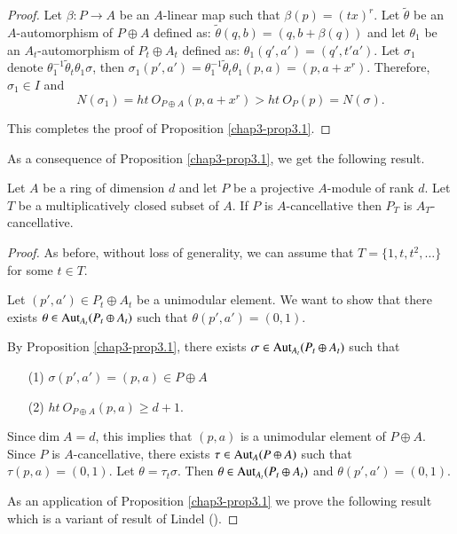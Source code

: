 \begin{proof}
Let $\beta:P\to A$ be an $A$-linear map such that
$\beta(p)=(tx)^{r}$. Let $\widetilde{\theta}$ be an $A$-automorphism
of $P\oplus A$ defined as:
$\widetilde{\theta}(q,b)=(q,b+\beta(q))$\pageoriginale 
and let $\theta_{1}$ be an $A_{t}$-automorphism of $P_{t}\oplus A_{t}$
defined as: $\theta_{1}(q',a')=(q',t'a')$. Let $\sigma_{1}$ denote
$\theta_{1}^{-1}\widetilde{\theta}_{t}\theta_{1}\sigma$, then
$\sigma_{1}(p',a')=\theta^{-1}_{1}\widetilde{\theta}_{t}\theta_{1}(p,a)=(p,a+x^{r})$. Therefore,
$\sigma_{1}\in I$ and 
$$
N(\sigma_{1})=ht\ O_{P\oplus A}(p,a+x^{r})>ht\ O_{P}(p)=N(\sigma).
$$

This completes the proof of Proposition \ref{chap3-prop3.1}.
\end{proof}

As a consequence of Proposition \ref{chap3-prop3.1}, we get the
following result.

\begin{corollary}\label{chap3-coro3.2}
Let $A$ be a ring of dimension $d$ and let $P$ be a projective
$A$-module of rank $d$. Let $T$ be a multiplicatively closed subset of
$A$. If $P$ is $A$-cancellative then $P_{T}$ is $A_{T}$-cancellative. 
\end{corollary}

\begin{proof}
As before, without loss of generality, we can assume that
$T=\{1,t,t^{2},\ldots\}$ for some $t\in T$.

Let $(p',a')\in P_{t}\oplus A_{t}$ be a unimodular element. We want to
show that there exists $\theta\in \operatorname{Aut}_{A_{t}}(P_{t}\oplus A_{t})$
such that $\theta(p',a')=(0,1)$. 

By Proposition \ref{chap3-prop3.1}, there exists
$\sigma\in \operatorname{Aut}_{A_{t}}(P_{t}\oplus A_{t})$ such that
\begin{itemize}
\item[(1)] $\sigma(p',a')=(p,a)\in P\oplus A$

\item[(2)] $ht\ O_{P\oplus A}(p,a)\geq d+1$.
\end{itemize}

Since\pageoriginale $\dim A=d$, this implies that $(p,a)$ is a
unimodular element of 
$P\oplus A$. Since $P$ is $A$-cancellative, there exists
$\tau\in \operatorname{Aut}_{A}(P\oplus A)$ such that $\tau(p,a)=(0,1)$. Let
$\theta=\tau_{t}\sigma$. Then $\theta\in \operatorname{Aut}_{A_{t}}(P_{t}\oplus
A_{t})$ and $\theta(p',a')=(0,1)$. 

As an application of Proposition \ref{chap3-prop3.1} we prove the
following result which is a variant of result of Lindel (\cite[2.8 Satz]{chap3-L-2}).
\end{proof}

